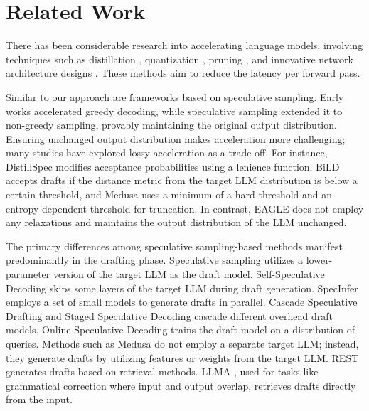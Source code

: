 \documentclass{article}
\theoremstyle{plain}
\theoremstyle{definition}
\theoremstyle{remark}
\begin{document}



\section{Related Work}

There has been considerable research into accelerating language models, involving techniques such as distillation \cite{hinton2015distilling}, quantization \cite{hubara2018quantized,shen2020q,kim2021bert,zadeh2020gobo,zafrir2019q8bert}, pruning \cite{gale2019state,sanh2020movement,kurtic2022optimal,voita2019analyzing}, and innovative network architecture designs \cite{gu2023mamba,wu2020lite}. These methods aim to reduce the latency per forward pass.

Similar to our approach are frameworks based on speculative sampling. Early works \cite{stern2018blockwise,sun2021instantaneous} accelerated greedy decoding, while speculative sampling \cite{leviathan2023fast,chen2023accelerating} extended it to non-greedy sampling, provably maintaining the original output distribution. Ensuring unchanged output distribution makes acceleration more challenging; many studies have explored lossy acceleration as a trade-off. For instance, DistillSpec \cite{zhou2023distillspec} modifies acceptance probabilities using a lenience function, BiLD \cite{kim2023speculative} accepts drafts if the distance metric from the target LLM distribution is below a certain threshold, and Medusa \cite{medusa} uses a minimum of a hard threshold and an entropy-dependent threshold for truncation. In contrast, EAGLE does not employ any relaxations and maintains the output distribution of the LLM unchanged.

The primary differences among speculative sampling-based methods manifest predominantly in the drafting phase. Speculative sampling \cite{leviathan2023fast,chen2023accelerating} utilizes a lower-parameter version of the target LLM as the draft model. Self-Speculative Decoding \cite{zhang2023draft} skips some layers of the target LLM during draft generation. SpecInfer \cite{miao2023specinfer} employs a set of small models to generate drafts in parallel. Cascade Speculative Drafting \cite{chen2023cascade} and Staged Speculative Decoding \cite{spector2023accelerating} cascade different overhead draft models. 
Online Speculative Decoding \cite{liu2023online} trains the draft model on a distribution of queries.
Methods \cite{hooper2023speed,fu2023lookahead,yang2023predictive} such as Medusa \cite{medusa} do not employ a separate target LLM; instead, they generate drafts by utilizing features or weights from the target LLM. REST \cite{he2023rest} generates drafts based on retrieval methods.
LLMA \cite{yang2023inference}, used for tasks like grammatical correction where input and output overlap, retrieves drafts directly from the input. 
\end{document}
